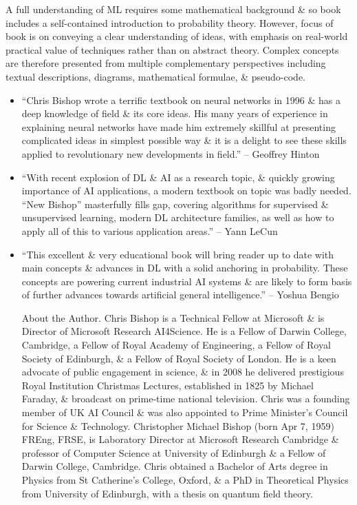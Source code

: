 \documentclass{article}
\begin{document}
A full understanding of ML requires some mathematical background \& so book includes a self-contained introduction to probability theory. However, focus of book is on conveying a clear understanding of ideas, with emphasis on real-world practical value of techniques rather than on abstract theory. Complex concepts are therefore presented from multiple complementary perspectives including textual descriptions, diagrams, mathematical formulae, \& pseudo-code.
\begin{itemize}
	\item ``{\sc Chris Bishop} wrote a terrific textbook on neural networks in 1996 \& has a deep knowledge of field \& its core ideas. His many years of experience in explaining neural networks have made him extremely skillful at presenting complicated ideas in simplest possible way \& it is a delight to see these skills applied to revolutionary new developments in field.'' -- {\sc Geoffrey Hinton}
	\item ``With recent explosion of DL \& AI as a research topic, \& quickly growing importance of AI applications, a modern textbook on topic was badly needed. ``New Bishop'' masterfully fills gap, covering algorithms for supervised \& unsupervised learning, modern DL architecture families, as well as how to apply all of this to various application areas.'' -- {\sc Yann LeCun}
	\item ``This excellent \& very educational book will bring reader up to date with main concepts \& advances in DL with a solid anchoring in probability. These concepts are powering current industrial AI systems \& are likely to form basis of further advances towards artificial general intelligence.'' -- {\sc Yoshua Bengio}
	
	{\sf About the Author.} {\sc Chris Bishop} is a Technical Fellow at Microsoft \& is Director of Microsoft Research AI4Science. He is a Fellow of Darwin College, Cambridge, a Fellow of Royal Academy of Engineering, a Fellow of Royal Society of Edinburgh, \& a Fellow of Royal Society of London. He is a keen advocate of public engagement in science, \& in 2008 he delivered prestigious Royal Institution Christmas Lectures, established in 1825 by {\sc Michael Faraday}, \& broadcast on prime-time national television. {\sc Chris} was a founding member of UK AI Council \& was also appointed to Prime Minister's Council for Science \& Technology. {\sc Christopher Michael Bishop} (born Apr 7, 1959) FREng, FRSE, is Laboratory Director at Microsoft Research Cambridge \& professor of Computer Science at University of Edinburgh \& a Fellow of Darwin College, Cambridge. {\sc Chris} obtained a Bachelor of Arts degree in Physics from St Catherine's College, Oxford, \& a PhD in Theoretical Physics from University of Edinburgh, with a thesis on quantum field theory.
	

\end{itemize}
\end{document}
